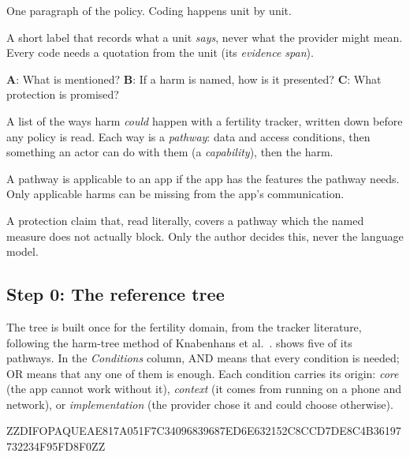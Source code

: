 \documentclass[twoside,its]{bossthesis}
\begin{document}
\begin{description}[leftmargin=0pt,itemsep=2pt]
  \item[Unit.] One paragraph of the policy. Coding happens unit by unit.
  \item[Code.] A short label that records what a unit \emph{says}, never what
    the provider might mean. Every code needs a quotation from the unit
    (its \emph{evidence span}).
  \item[Three questions (axes).] \textbf{A}: What is mentioned? \textbf{B}: If
    a harm is named, how is it presented? \textbf{C}: What protection is
    promised?
  \item[Reference tree.] A list of the ways harm \emph{could} happen with a
    fertility tracker, written down before any policy is read. Each way is a
    \emph{pathway}: data and access conditions, then something an actor
    can do with them (a \emph{capability}), then the harm.
  \item[Applicable.] A pathway is applicable to an app if the app has the
    features the pathway needs. Only applicable harms can be missing from the
    app's communication.
  \item[Potential mismatch.] A protection claim that, read literally, covers
    a pathway which the named measure does not actually block. Only the author
    decides this, never the language model.
\end{description}

\subsection*{Step 0: The reference tree}

The tree is built once for the fertility domain, from the tracker
literature, following the harm-tree method of Knabenhans et
al.~\parencite{knabenhans2026harms}.  shows five of its
pathways. In the \emph{Conditions} column, AND means that every condition is
needed; OR means that any one of them is enough. Each condition carries its
origin: \emph{core} (the app cannot work without it), \emph{context} (it comes
from running on a phone and network), or \emph{implementation} (the provider
chose it and could choose otherwise).



ZZDIFOPAQUEAE817A051F7C34096839687ED6E632152C8CCD7DE8C4B36197732234F95FD8F0ZZ
\end{document}

